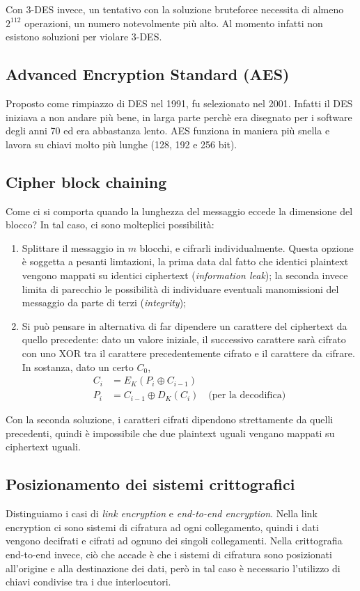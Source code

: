 \documentclass[a4paper, 10pt, twoside]{article}
\begin{document}
	Con 3-DES invece, un tentativo con la soluzione bruteforce necessita di almeno $2^{112}$ operazioni, un numero notevolmente più alto. Al momento infatti non esistono soluzioni per violare 3-DES.
	
	\subsection{Advanced Encryption Standard (AES)}
	Proposto come rimpiazzo di DES nel 1991, fu selezionato nel 2001. Infatti il DES iniziava a non andare più bene, in larga parte perchè era disegnato per i software degli anni 70 ed era abbastanza lento. AES funziona in maniera più snella e lavora su chiavi molto più lunghe (128, 192 e 256 bit).
	
	\subsection{Cipher block chaining}
	Come ci si comporta quando la lunghezza del messaggio eccede la dimensione del blocco? In tal caso, ci sono molteplici possibilità:\begin{enumerate}
		\item Splittare il messaggio in $m$ blocchi, e cifrarli individualmente. Questa opzione è soggetta a pesanti limtazioni, la prima data dal fatto che identici plaintext vengono mappati su identici ciphertext (\textit{information leak}); la seconda invece limita di parecchio le possibilità di individuare eventuali manomissioni del messaggio da parte di terzi (\textit{integrity});
		
		\item Si può pensare in alternativa di far dipendere un carattere del ciphertext da quello precedente: dato un valore iniziale, il successivo carattere sarà cifrato con uno XOR tra il carattere precedentemente cifrato e il carattere da cifrare. In sostanza, dato un certo $C_0$, \begin{align*}
			C_i &= E_K(P_i \oplus C_{i-1}) \\
			P_i &= C_{i-1} \oplus D_K(C_i) \quad \text{(per la decodifica)}
		\end{align*}
	\end{enumerate}

	Con la seconda soluzione, i caratteri cifrati dipendono strettamente da quelli precedenti, quindi è impossibile che due plaintext uguali vengano mappati su ciphertext uguali.
	
	\subsection{Posizionamento dei sistemi crittografici}
	Distinguiamo i casi di \textit{link encryption} e \textit{end-to-end encryption}.
	Nella link encryption ci sono sistemi di cifratura ad ogni collegamento, quindi i dati vengono decifrati e cifrati ad ognuno dei singoli collegamenti. Nella crittografia end-to-end invece, ciò che accade è che i sistemi di cifratura sono posizionati all'origine e alla destinazione dei dati, però in tal caso è necessario l'utilizzo di chiavi condivise tra i due interlocutori.
	
\end{document}
